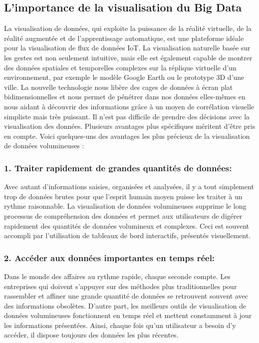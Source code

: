 \documentclass[french, a4paper, 12pt]{report}
\begin{document}
\subsection{L’importance de la visualisation du Big Data}
La visualisation de données, qui exploite la puissance de la réalité virtuelle, de la réalité augmentée et de l’apprentissage automatique, est une plateforme idéale pour la visualisation de flux de données IoT. La visualisation naturelle basée sur les gestes est non seulement intuitive, mais elle est également capable de montrer des données spatiales et temporelles complexes sur la réplique virtuelle d’un environnement, par exemple le modèle Google Earth ou le prototype 3D d’une ville.
La nouvelle technologie nous libère des cages de données à écran plat bidimensionnelles et nous permet de pénétrer dans nos données elles-mêmes en nous aidant à découvrir des informations grâce à un moyen de corrélation visuelle simpliste mais très puissant. Il n’est pas difficile de prendre des décisions avec la visualisation des données.
Plusieurs avantages plus spécifiques méritent d’être pris en compte. Voici quelques-uns des avantages les plus précieux de la visualisation de données volumineuses :
\subsubsection{1. Traiter rapidement de grandes quantités de données:}
Avec autant d’informations saisies, organisées et analysées, il y a tout simplement trop de données brutes pour que l’esprit humain moyen puisse les traiter à un rythme raisonnable. La visualisation de données volumineuses supprime le long processus de compréhension des données et permet aux utilisateurs de digérer rapidement des quantités de données volumineux et complexes. Ceci est souvent accompli par l’utilisation de tableaux de bord interactifs, présentés visuellement.
\subsubsection{2. Accéder aux données importantes en temps réel:}
Dans le monde des affaires au rythme rapide, chaque seconde compte. Les entreprises qui doivent s’appuyer sur des méthodes plus traditionnelles pour rassembler et affiner une grande quantité de données se retrouvent souvent avec des informations obsolètes. D'autre part, les meilleurs outils de visualisation de données volumineuses fonctionnent en temps réel et mettent constamment à jour les informations présentées. Ainsi, chaque fois qu'un utilisateur a besoin d'y accéder, il dispose toujours des données les plus récentes.
\end{document}

